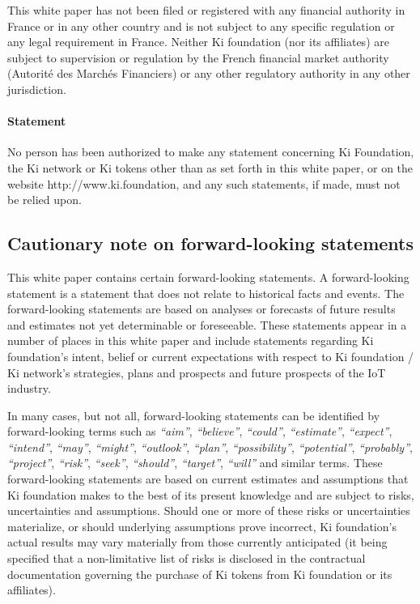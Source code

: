 This white paper has not been filed or registered with any financial authority in France or in any other country and is not subject to any specific regulation or any legal requirement in France. Neither Ki foundation (nor its affiliates) are subject to supervision or regulation by the French financial market authority (Autorité des Marchés Financiers) or any other regulatory authority in any other jurisdiction.

\paragraph{Statement}
No person has been authorized to make any statement concerning Ki Foundation, the Ki network or Ki tokens other than as set forth in this white paper, or on the website http://www.ki.foundation, and any such statements, if made, must not be relied upon.
\subsection{Cautionary note on forward-looking statements}
This white paper contains certain forward-looking statements. A forward-looking statement is a statement that does not relate to historical facts and events. The forward-looking statements are based on analyses or forecasts of future results and estimates not yet determinable or foreseeable. These statements appear in a number of places in this white paper and include statements regarding Ki foundation's intent, belief or current expectations with respect to Ki foundation / Ki network's strategies, plans and prospects and future prospects of the IoT industry.

In many cases, but not all, forward-looking statements can be identified by forward-looking terms such as \textit{``aim''}, \textit{``believe''}, \textit{``could''}, \textit{``estimate”}, \textit{``expect''}, \textit{``intend''}, \textit{``may''}, \textit{``might''}, \textit{``outlook''}, \textit{``plan''}, \textit{``possibility''}, \textit{``potential''}, \textit{``probably''}, \textit{``project''}, \textit{``risk''}, \textit{``seek''}, \textit{``should''}, \textit{``target''}, \textit{``will''} and similar terms. These forward-looking statements are based on current estimates and assumptions that Ki foundation makes to the best of its present knowledge and are subject to risks, uncertainties and assumptions. Should one or more of these risks or uncertainties materialize, or should underlying assumptions prove incorrect, Ki foundation's actual results may vary materially from those currently anticipated (it being specified that a non-limitative list of risks is disclosed in the contractual documentation governing the purchase of Ki tokens from Ki foundation or its affiliates). 

